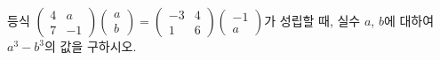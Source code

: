 등식 $\begin{pmatrix} 4 & a \\ 7 & -1 \end{pmatrix}\begin{pmatrix} a \\ b \end{pmatrix}=\begin{pmatrix} -3 & 4 \\ 1 & 6 \end{pmatrix}\begin{pmatrix} -1 \\ a \end{pmatrix}$가 성립할 때, 실수 $a$, $b$에 대하여 $a^3-b^3$의 값을 구하시오.
